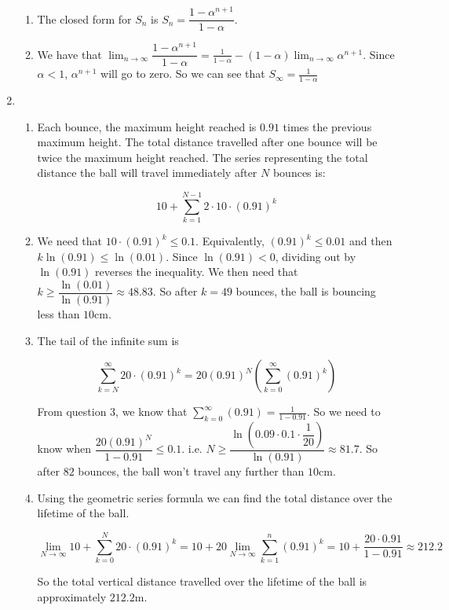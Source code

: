 \begin{enumerate}
\begin{enumerate}
        \item The closed form for $S_n$ is $S_n = \dfrac{1-\alpha^{n+1}}{1-\alpha}$.

        \item We have that $\lim_{n\to \infty} \dfrac{1-\alpha^{n+1}}{1-\alpha}= \frac{1}{1-\alpha} - (1-\alpha)\lim_{n\to \infty} \alpha^{n+1}$. Since $\alpha<1$, $\alpha^{n+1}$ will go to zero. So we can see that $S_\infty = \frac{1}{1-\alpha}$ 
    \end{enumerate}
    \item
    \begin{enumerate}
        \item Each bounce, the maximum height reached is $0.91$ times the previous maximum height. The total distance travelled after one bounce will be twice the maximum height reached. The series representing the total distance the ball will travel immediately after $N$ bounces is:

        \[10 + \sum_{k=1}^{N-1}2\cdot 10 \cdot (0.91)^k\]
        

        \item We need that $10\cdot (0.91)^k \leq 0.1$. Equivalently, $(0.91)^k \leq 0.01$ and then $k\ln(0.91) \leq \ln(0.01) $. Since $\ln(0.91) < 0$, dividing out by $\ln(0.91)$ reverses the inequality. We then need that $k \geq \dfrac{\ln(0.01)}{\ln(0.91)} \approx 48.83$. So after $k=49$ bounces, the ball is bouncing less than $10$cm. 

        \item The tail of the infinite sum is

        \[\sum_{k=N}^\infty 20 \cdot (0.91)^k = 20(0.91)^N(\sum_{k=0}^\infty (0.91)^k)\]

        From question 3, we know that $\sum_{k=0}^\infty (0.91) = \frac{1}{1-0.91}$. So we need to know when $\dfrac{20(0.91)^N}{1-0.91} \leq 0.1$. i.e. $N \geq \dfrac{\ln(0.09\cdot0.1\cdot\dfrac{1}{20})}{\ln(0.91)} \approx 81.7$. So after $82$ bounces, the ball won't travel any further than $10$cm. 

        

        \item Using the geometric series formula we can find the total distance over the lifetime of the ball.

        \[\lim_{N\to \infty} 10 + \sum_{k=0}^N 20\cdot(0.91)^k = 10 + 20 \lim_{N\to \infty}\sum_{k=1}^n(0.91)^k = 10 +\frac{20 \cdot 0.91}{1-0.9 1} \approx 212.2\]

        So the total vertical distance travelled over the lifetime of the ball is approximately $212.2$m.
    \end{enumerate}
    
    
        
\end{enumerate}